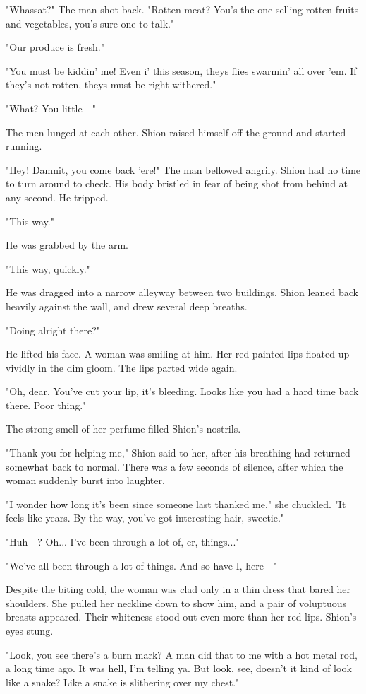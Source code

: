 "Whassat?" The man shot back. "Rotten meat? You's the one selling rotten
fruits and vegetables, you's sure one to talk."

"Our produce is fresh."

"You must be kiddin' me! Even i' this season, theys flies swarmin' all
over 'em. If they's not rotten, theys must be right withered."

"What? You little―"

The men lunged at each other. Shion raised himself off the ground and
started running.

"Hey! Damnit, you come back 'ere!" The man bellowed angrily. Shion had
no time to turn around to check. His body bristled in fear of being shot
from behind at any second. He tripped.

"This way."

He was grabbed by the arm.

"This way, quickly."

He was dragged into a narrow alleyway between two buildings. Shion
leaned back heavily against the wall, and drew several deep breaths.

"Doing alright there?"

He lifted his face. A woman was smiling at him. Her red painted lips
floated up vividly in the dim gloom. The lips parted wide again.

"Oh, dear. You've cut your lip, it's bleeding. Looks like you had a hard
time back there. Poor thing."

The strong smell of her perfume filled Shion's nostrils.

"Thank you for helping me," Shion said to her, after his breathing had
returned somewhat back to normal. There was a few seconds of silence,
after which the woman suddenly burst into laughter.

"I wonder how long it's been since someone last thanked me," she
chuckled. "It feels like years. By the way, you've got interesting hair,
sweetie."

"Huh―? Oh... I've been through a lot of, er, things..."

"We've all been through a lot of things. And so have I, here―"

Despite the biting cold, the woman was clad only in a thin dress that
bared her shoulders. She pulled her neckline down to show him, and a
pair of voluptuous breasts appeared. Their whiteness stood out even more
than her red lips. Shion's eyes stung.

"Look, you see there's a burn mark? A man did that to me with a hot
metal rod, a long time ago. It was hell, I'm telling ya. But look, see,
doesn't it kind of look like a snake? Like a snake is slithering over my
chest."

